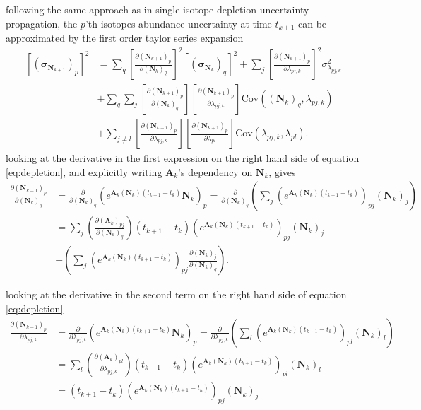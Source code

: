 \documentclass[a4paper]{article}
\begin{document}
following the same approach as in single isotope depletion uncertainty propagation, the $p$'th isotopes abundance uncertainty at time $t_{k+1}$ can be approximated by the first order taylor series expansion
\begin{equation}
  \label{eq:depletion}
  \begin{split}
  \left[(\bm{\sigma}_{\bm{N}_{k+1}})_p\right]^2
  &=\sum_q\left[\frac{\partial (\bm{N}_{k+1})_p}{\partial (\bm{N}_k)_q}\right]^2 \left[(\bm{\sigma}_{\bm{N}_k})_q\right]^2
   +\sum_{j}\left[\frac{\partial (\bm{N}_{k+1})_p}{\partial \lambda_{pj,k}}\right]^2 \sigma_{\lambda_{pj,k}}^2  \\
  &+\sum_q\sum_{j}\left[\frac{\partial (\bm{N}_{k+1})_p}{\partial (\bm{N}_k)_q}\right]\left[\frac{\partial (\bm{N}_{k+1})_p}{\partial \lambda_{pj,k}}\right]\text{Cov}\left((\bm{N}_k)_q,\lambda_{pj,k}\right) \\
  &+\sum_{j\neq l}\left[\frac{\partial (\bm{N}_{k+1})_p}{\partial \lambda_{pj,k}}\right]\left[\frac{\partial (\bm{N}_{k+1})_p}{\partial \lambda_{pl}}\right]\text{Cov}\left(\lambda_{pj,k},\lambda_{pl}\right).
  \end{split}
\end{equation}
looking at the derivative in the first expression on the right hand side of equation \ref{eq:depletion}, and explicitly writing $\bm{A}_k$'s dependency on  $\bm{N}_k$, gives
\begin{equation}
  \begin{split}
  \frac{\partial (\bm{N}_{k+1})_p}{\partial (\bm{N}_k)_q}
  &=\frac{\partial }{\partial (\bm{N}_k)_q} \left( e^{\bm{A}_k(\bm{N}_k)(t_{k+1}-t_k)}\bm{N}_k \right)_p
  =\frac{\partial }{\partial (\bm{N}_k)_q} \left(\sum_{j}\left( e^{\bm{A}_k(\bm{N}_k)(t_{k+1}-t_k)} \right)_{pj}(\bm{N}_k)_j \right) \\
  &=\sum_{j}\left( \frac{\partial (\bm{A}_k)_{pj}}{\partial (\bm{N}_k)_q} \right) (t_{k+1}-t_k) \left(e^{\bm{A}_k(\bm{N}_k)(t_{k+1}-t_k)} \right)_{pj}(\bm{N}_k)_j\\
  &+\left(\sum_{j}\left( e^{\bm{A}_k(\bm{N}_k)(t_{k+1}-t_k)} \right)_{pj}\frac{\partial (\bm{N}_k)_j}{\partial (\bm{N}_k)_q} \right).
  \end{split}
\end{equation}

looking at the derivative in the second term on the right hand side of equation \ref{eq:depletion}
\begin{equation}
  \begin{split}
  \frac{\partial (\bm{N}_{k+1})_p}{\partial \lambda_{pj,k}}
  &=\frac{\partial }{\partial \lambda_{pj,k}} \left( e^{\bm{A}_k(\bm{N}_k)(t_{k+1}-t_k)}\bm{N}_k \right)_p
   =\frac{\partial }{\partial \lambda_{pj,k}} \left(\sum_{l}\left( e^{\bm{A}_k(\bm{N}_k)(t_{k+1}-t_k)} \right)_{pl}(\bm{N}_k)_l \right) \\
  &=\sum_{l}\left( \frac{\partial (\bm{A}_k)_{pl}}{\partial \lambda_{pj,k}} \right) (t_{k+1}-t_k) \left(e^{\bm{A}_k(\bm{N}_k)(t_{k+1}-t_k)} \right)_{pl}(\bm{N}_k)_l \\
  &=(t_{k+1}-t_k) \left(e^{\bm{A}_k(\bm{N}_k)(t_{k+1}-t_k)} \right)_{pj} (\bm{N}_k)_j
  \end{split}
\end{equation}
\end{document}
